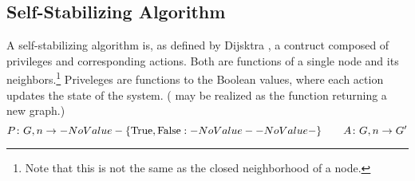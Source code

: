 \subsection{Self-Stabilizing Algorithm}
\label{sec:math-define:self-stab-algor}

A self-stabilizing algorithm is, as defined by
  Dijsktra \autocite{Dijkstra:1974:SSS:361179.361202},
  a contruct composed of \glspl{privilege} and corresponding \glspl{action}.
Both are functions of a single node and its neighbors.\footnote{%
  Note that this is not the same as the closed neighborhood of a node.}
Priveleges are functions to the Boolean values,
  where each action updates the state of the system.
( may be realized as the function returning a new graph.)
\[
\Function[P]{G, n}{\SetBoolean}
\qquad
\Function[A]{G, n}{G^\prime}
\]

